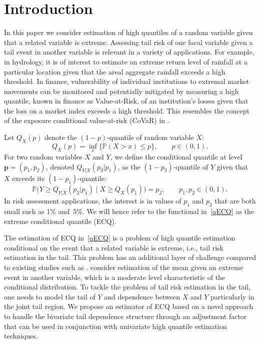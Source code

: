 \documentclass[11pt,letterpaper]{article}
\def\bql{\begin{equation}\label}
\def\eql{\end{equation}\noindent}
\def\pb{{\mathbf p}}
\def\pbb{{\mathbb P}}
\numberwithin{equation}{section}
\begin{document}
\section{Introduction}


In this paper we consider estimation of high quantiles of a random variable given that a related variable is extreme.  Assessing tail risk of one focal variable given a tail event in another variable is relevant in a variety of applications. For example, in hydrology, it is of interest to estimate an extreme return level of rainfall at a particular location given that the areal aggregate rainfall exceeds a high threshold. In finance, vulnerability of individual institutions to extremal market movements can be monitored and potentially mitigated by measuring a high quantile, known in finance as  Value-at-Risk, of an institution's losses given that the loss on a market index exceeds a high threshold. This resembles the concept of the exposure conditional value-at-risk (CoVaR) in \cite{AdrianBrunnermeier2016}. 

Let $Q_X(p)$ denote the $(1-p)$-quantile of random variable $X$: 
$$Q_{X}(p) = \inf_x\bigl\{\pbb(X> x)\le p\bigr \},\qquad p\in(0,1).$$
For two random variables $X$ and $Y$, we define the conditional quantile at level $\pb=(p_1,p_2)$, denoted $Q_{Y|X}(p_2|p_1)$,  as the $(1-p_2)$-quantile of $Y$ given that $X$ exceeds its $(1-p_1)$-quantile:
\bql{qECQ}
\pbb\bigl(Y\ge Q_{Y|X}(p_2|p_1)\mid X\ge Q_X(p_1)\bigr) = p_2,\qquad p_1,p_2\in(0,1).
\eql
In risk assessment applications, the interest is in values of $p_1$ and $p_2$ that are both small such as 1\% and~5\%. We will hence refer to the functional in~\eqref{qECQ} as the extreme conditional quantile (ECQ). 


The estimation of ECQ in~\eqref{qECQ} is a problem of high quantile estimation conditional on the event that a related variable is extreme, i.e., tail risk estimation in the tail. This problem has an additional layer of challenge compared to existing studies such as \cite{Cai2014}. \cite{Cai2014} consider estimation of the mean given an extreme event in another variable, which is a moderate level characteristic of the conditional distribution. 
To tackle the problem of tail risk estimation in the tail, one needs to model the tail of $Y$ and dependence between $X$ and $Y$ particularly in the joint tail region. We propose an estimator of ECQ based on a novel approach  to handle the bivariate tail dependence structure through an adjustment factor that can be used in conjunction with univariate high quantile estimation techniques. 
\end{document}
